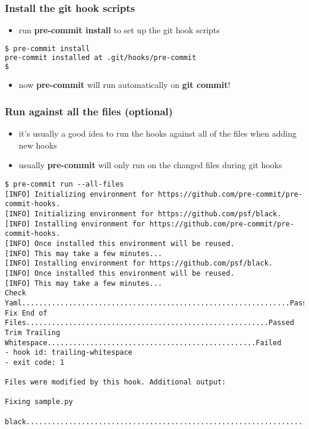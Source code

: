 \begin{frame}[fragile]
  \frametitle{Install the git hook scripts}
  \begin{itemize}
    \item run \textbf{pre-commit install} to set up the git hook scripts
  \end{itemize}

  \begin{lstlisting}[language=Bash]
$ pre-commit install
pre-commit installed at .git/hooks/pre-commit
$
  \end{lstlisting}

  \begin{itemize}
    \item now \textbf{pre-commit} will run automatically on \textbf{git
      commit}!
  \end{itemize}
\end{frame}

\begin{frame}[fragile]
  \frametitle{Run against all the files (optional)}
  \begin{itemize}
    \item it's usually a good idea to run the hooks against all of the
      files when adding new hooks 
    \item usually \textbf{pre-commit} will only run on the changed files
      during git hooks
  \end{itemize}

\begin{tiny}
\begin{verbatim}
$ pre-commit run --all-files
[INFO] Initializing environment for https://github.com/pre-commit/pre-commit-hooks.
[INFO] Initializing environment for https://github.com/psf/black.
[INFO] Installing environment for https://github.com/pre-commit/pre-commit-hooks.
[INFO] Once installed this environment will be reused.
[INFO] This may take a few minutes...
[INFO] Installing environment for https://github.com/psf/black.
[INFO] Once installed this environment will be reused.
[INFO] This may take a few minutes...
Check Yaml...............................................................Passed
Fix End of Files.........................................................Passed
Trim Trailing Whitespace.................................................Failed
- hook id: trailing-whitespace
- exit code: 1

Files were modified by this hook. Additional output:

Fixing sample.py

black....................................................................Passed
\end{verbatim}
\end{tiny}
\end{frame}
